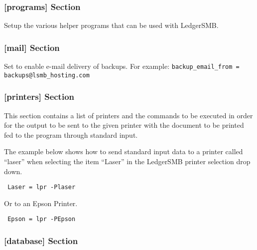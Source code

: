\subsubsection{[programs] Section}
\label{subsubsec-global-config-ledgersmb-conf-programs}

Setup the various helper programs that can be used with LedgerSMB.



\subsubsection{[mail] Section}
\label{subsubsec-global-config-ledgersmb-conf-mail}

\begin{description}[style=nextline]
	\item [backup\_email\_from] Set to enable e-mail delivery of backups. For example:
	\texttt{backup\_email\_from = backups@lsmb\_hosting.com}

\end{description}

\subsubsection{[printers] Section}
\label{subsubsec-global-config-ledgersmb-conf-printers}

This section contains a list of printers and the commands
to be executed in order for the output to be sent to the given printer with
the document to be printed fed to the program through standard input.

The example below shows how to send standard input data to a printer called ``laser''
when selecting the item ``Laser'' in the LedgerSMB printer selection drop down.

\texttt{
	Laser    = lpr -Plaser
}

Or to an Epson Printer.

\texttt{
	Epson   = lpr -PEpson
}


\subsubsection{[database] Section}
\label{subsubsec-global-config-ledgersmb-conf-database}

